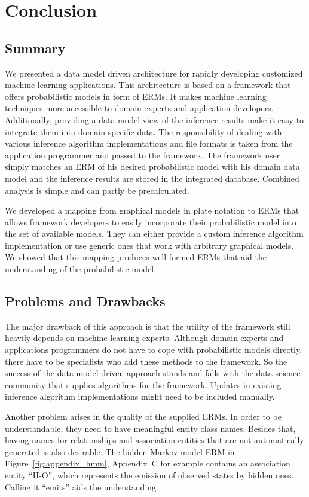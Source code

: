 \section{Conclusion}

\subsection{Summary}

We presented a data model driven architecture for rapidly developing customized machine learning applications. This architecture is based on a framework that offers probabilistic models in form of ERMs. It makes machine learning techniques more accessible to domain experts and application developers. Additionally, providing a data model view of the inference results make it easy to integrate them into domain specific data. The responsibility of dealing with various inference algorithm implementations and file formats is taken from the application programmer and passed to the framework. The framework user simply matches an ERM of his desired probabilistic model with his domain data model and the inference results are stored in the integrated database. Combined analysis is simple and can partly be precalculated.

We developed a mapping from graphical models in plate notation to ERMs that allows framework developers to easily incorporate their probabilistic model into the set of available models. They can either provide a custom inference algorithm implementation or use generic ones that work with arbitrary graphical models. We showed that this mapping produces well-formed ERMs that aid the understanding of the probabilistic model.

\subsection{Problems and Drawbacks}

The major drawback of this approach is that the utility of the framework still heavily depends on machine learning experts. Although domain experts and applications programmers do not have to cope with probabilistic models directly, there have to be specialists who add these methods to the framework. So the success of the data model driven approach stands and falls with the data science community that supplies algorithms for the framework. Updates in existing inference algorithm implementations might need to be included manually.

Another problem arises in the quality of the supplied ERMs. In order to be understandable, they need to have meaningful entity class names. Besides that, having names for relationships and association entities that are not automatically generated is also desirable. The hidden Markov model ERM in Figure~\ref{fig:appendix_hmm}, Appendix~C for example contains an association entity ``H-O'', which represents the emission of observed states by hidden ones. Calling it ``emits'' aids the understanding.

